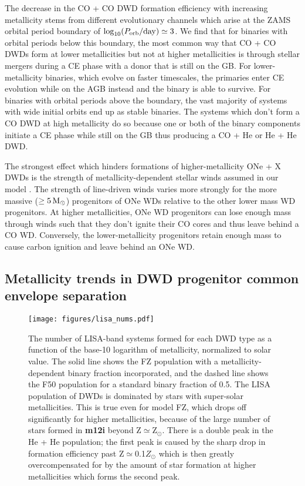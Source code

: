 \documentclass[twocolumn, linenumbers]{aastex631}
\begin{document}
The decrease in the CO + CO DWD formation efficiency with increasing metallicity stems from different evolutionary channels which arise at the ZAMS orbital period boundary of $\log_{10}(P_{\rm{orb}}/\rm{day})\simeq3$. We find that for binaries with orbital periods below this boundary, the most common way that CO + CO DWDs form at lower metallicities but not at higher metallicities is through stellar mergers during a CE phase with a donor that is still on the GB. For lower-metallicity binaries, which evolve on faster timescales, the primaries enter CE evolution while on the AGB instead and the binary is able to survive. For binaries with orbital periods above the boundary, the vast majority of systems with wide initial orbits end up as stable binaries. The systems which don’t form a CO DWD at high metallicity do so because one or both of the binary components initiate a CE phase while still on the GB thus producing a CO + He or He + He DWD. 

The strongest effect which hinders formations of higher-metallicity ONe + X DWDs is the strength of metallicity-dependent stellar winds assumed in our model \citep{Vink2001}. The strength of line-driven winds varies more strongly for the more massive ($\geq5\,\rm{M}_\odot$) progenitors of ONe WDs relative to the other lower mass WD progenitors. At higher metallicities, ONe WD progenitors can lose enough mass through winds such that they don't ignite their CO cores and thus leave behind a CO WD. Conversely, the lower-metallicity progenitors retain enough mass to cause carbon ignition and leave behind an ONe WD.

\subsection{Metallicity trends in DWD progenitor common envelope separation}\label{sec:CEsep}

\begin{figure*}
	\texttt{[image: figures/lisa\_nums.pdf]}
    \caption{The number of LISA-band systems formed for each DWD type as a function of the base-10 logarithm of metallicity, normalized to solar value. The solid line shows the FZ population with a metallicity-dependent binary fraction incorporated, and the dashed line shows the F50 population for a standard binary fraction of 0.5. The LISA population of DWDs is dominated by stars with super-solar metallicities. This is true even for model FZ, which drops off significantly for higher metallicities, because of the large number of stars formed in \textbf{m12i} beyond Z$\simeq$Z$_\odot$. There is a double peak in the He + He population; the first peak is caused by the sharp drop in formation efficiency past Z$\simeq$0.1$Z_\odot$ which is then greatly overcompensated for by the amount of star formation at higher metallicities which forms the second peak.}
    \label{fig:lisa_nums}
\end{figure*}
\end{document}
